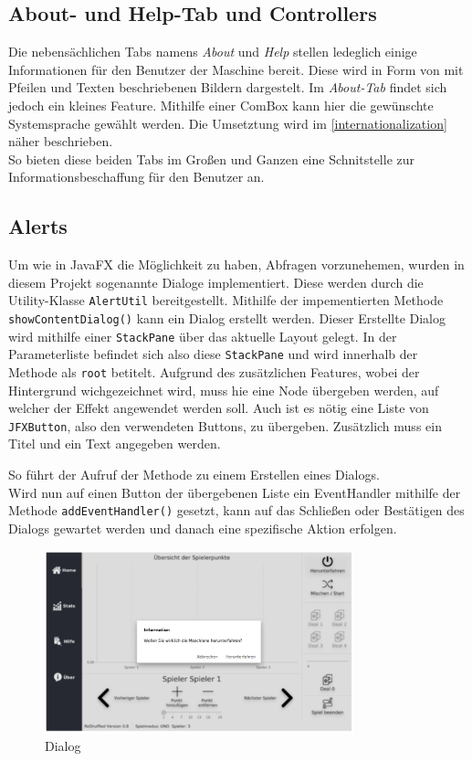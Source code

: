 \subsection{About- und Help-Tab und Controllers}
Die nebensächlichen Tabs namens \textit{About} und \textit{Help} stellen ledeglich einige Informationen für den Benutzer der Maschine bereit.
Diese wird in Form von mit Pfeilen und Texten beschriebenen Bildern dargestelt.
Im \textit{About-Tab} findet sich jedoch ein kleines Feature.
Mithilfe einer ComBox kann hier die gewünschte Systemsprache gewählt werden.
Die Umsetztung wird im \autoref{internationalization} näher beschrieben.\\
So bieten diese beiden Tabs im Großen und Ganzen eine Schnitstelle zur Informationsbeschaffung für den Benutzer an.
\subsection{Alerts}\label{sssec:alert}
Um wie in JavaFX die Möglichkeit zu haben, Abfragen vorzunehemen, wurden in diesem Projekt sogenannte Dialoge implementiert.
Diese werden durch die Utility-Klasse \lstinline[style=java]{AlertUtil} bereitgestellt.
Mithilfe der impementierten Methode \lstinline[style=java]{showContentDialog()} kann ein Dialog erstellt werden.
Dieser Erstellte Dialog wird mithilfe einer \lstinline[style=java]{StackPane} über das aktuelle Layout gelegt.
In der Parameterliste befindet sich also diese \lstinline[style=java]{StackPane} und wird innerhalb der Methode als \lstinline[style=java]{root} betitelt.
Aufgrund des zusätzlichen Features, wobei der Hintergrund wichgezeichnet wird, muss hie eine Node übergeben werden, auf welcher der Effekt angewendet werden soll.
Auch ist es nötig eine Liste von \lstinline[style=java]{JFXButton}, also den verwendeten Buttons, zu übergeben.
Zusätzlich muss ein Titel und ein Text angegeben werden.

So führt der Aufruf der Methode zu einem Erstellen eines Dialogs.\\
Wird nun auf einen Button der übergebenen Liste ein EventHandler mithilfe der Methode \lstinline[style=java]{addEventHandler()} gesetzt,
kann auf das Schließen oder Bestätigen des Dialogs gewartet werden und danach eine spezifische Aktion erfolgen.
\begin{figure}[H]
\centering
\includegraphics[width=0.8\textwidth]{fig/ainf/Shutdown-Dialog.png}
\caption{Dialog}
\label{shutdown}
\end{figure}
